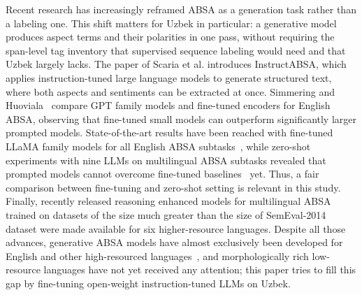 \documentclass[bdcc,article,submit,moreauthors]{Definitions/mdpi}
\begin{document}
Recent research has increasingly reframed ABSA as a generation task rather than a labeling one. This shift matters for Uzbek in particular: a generative model produces aspect terms and their polarities in one pass, without requiring the span-level tag inventory that supervised sequence labeling would need and that Uzbek largely lacks. The paper of Scaria et al.\cite{scaria-etal-2024-instructabsa} introduces InstructABSA, which applies instruction-tuned large language models to generate structured text, where both aspects and sentiments can be extracted at once. Simmering and Huoviala~\cite{simmering2023llmabsa} compare GPT family models and fine-tuned encoders for English ABSA, observing that fine-tuned small models can outperform significantly larger prompted models. State-of-the-art results have been reached with fine-tuned LLaMA family models for all English ABSA subtasks~\cite{smid-etal-2024-llama}, while zero-shot experiments with nine LLMs on multilingual ABSA subtasks revealed that prompted models cannot overcome fine-tuned baselines~\cite{Wu2025} yet. Thus, a fair comparison between fine-tuning and zero-shot setting is relevant in this study. Finally, recently released reasoning enhanced models for multilingual ABSA trained on datasets of the size much greater than the size of SemEval-2014 dataset were made available for six higher-resource languages. Despite all those advances, generative ABSA models have almost exclusively been developed for English and other high-resourced languages~\cite{liskowski2026arctic}, and morphologically rich low-resource languages have not yet received any attention; this paper tries to fill this gap by fine-tuning open-weight instruction-tuned LLMs on Uzbek.

\end{document}
